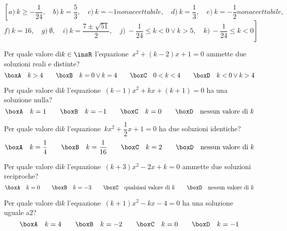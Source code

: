 \begin{flushright}
\(\left[a)~ k \geq-\dfrac{1}{24} ,\quad b)~ k = \dfrac{5}{3} ,\quad 
c)~ k=-1  non accettabile,\quad d)~ k = \dfrac{1}{3} ,\quad e)~ k 
=-\dfrac{1}{2} non accettabile,\quad \right.\)
\(\left.f)~ k = 16 ,\quad g)~ \emptyset ,\quad 
i)~ k = \dfrac{7 \pm \sqrt{51}}{2} ,\quad j)~ - \dfrac{1}{24} \leq k < 0 
\vee k 
> 5 ,\quad k)~ - \dfrac{1}{24} \leq k < 0 \right]\)
\end{flushright}

\begin{esercizio}
 \label{ese:3.106}
Per quale valore di\(k \in \insR\) l'equazione~\(x^{2} + (k-2) x + 1 = 0\) 
ammette 
due soluzioni reali e distinte?
\[\boxA\quad k > 4\qquad\boxB\quad k = 0 \vee k = 4\qquad\boxC\quad 0 < k < 
4\qquad\boxD\quad k < 0 \vee k > 4\]
\end{esercizio}

\begin{esercizio}
 \label{ese:3.107}
Per quale valore di\(k\) l'equazione~\((k-1) x^{2} + kx + (k + 1) = 0\) ha 
una 
soluzione nulla?
\[\boxA\quad k = 1\qquad\boxB\quad k = -1\qquad\boxC\quad k 
=0\qquad\boxD\quad 
\text{nessun valore di }k\]
\end{esercizio}

\begin{esercizio}
 \label{ese:3.108}
Per quale valore di\(k\) l'equazione~\(kx^{2} + \dfrac{1}{2} x + 1 = 0\) ha 
due 
soluzioni identiche?
\[\boxA\quad k = \dfrac{1}{4}\qquad\boxB\quad k = 
\dfrac{1}{16}\qquad\boxC\quad k 
= 2\qquad\boxD\quad \text{nessun valore di }k\]
\end{esercizio}

\begin{esercizio}
 \label{ese:3.109}
Per quale valore di\(k\) l'equazione~\((k + 3) x^{2}-2x + k = 0\) ammette 
due 
soluzioni reciproche?
\[\boxA\quad k = 0\qquad\boxB\quad k = -3\qquad\boxC\quad \text{qualsiasi 
valore 
di }k\qquad\boxD\quad \text{nessun valore di }k\]
\end{esercizio}

\begin{esercizio}
 \label{ese:3.110}
Per quale valore di\(k\) l'equazione~\((k + 1) x^{2}-kx-4 = 0\) ha una 
soluzione 
uguale a\(2\)?
\[\boxA\quad k = 4\qquad\boxB\quad k =-2\qquad\boxC\quad k = 
0\qquad\boxD\quad k 
=-1\]
\end{esercizio}

